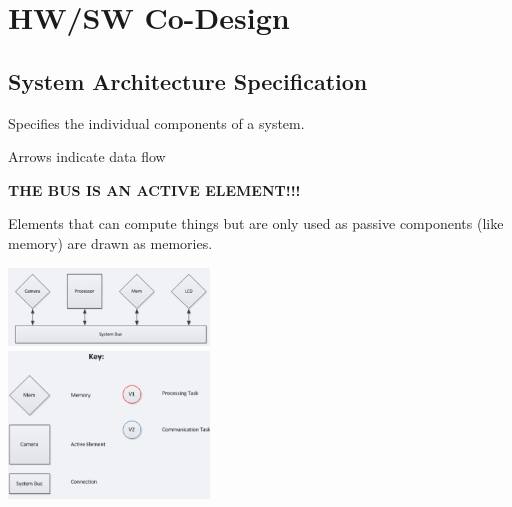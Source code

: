 \section{HW/SW Co-Design }
	\subsection{System Architecture Specification}
	
		\begin{compactitem}
		  \item Specifies the individual components of a system.
		  \item Arrows indicate data flow
		  \item {\color{red}\textbf{THE BUS IS AN ACTIVE ELEMENT!!!}}
		  \item Elements that can compute things but are only used as passive components (like memory) are drawn as memories.
		\end{compactitem}
		
		\begin{multicols}{2}
			\includegraphics[width=0.4\textwidth]{./pictures/systemArchDiagram.png} \\
			\includegraphics[width=0.4\textwidth]{./pictures/systemArchKey.png}
		\end{multicols}	

